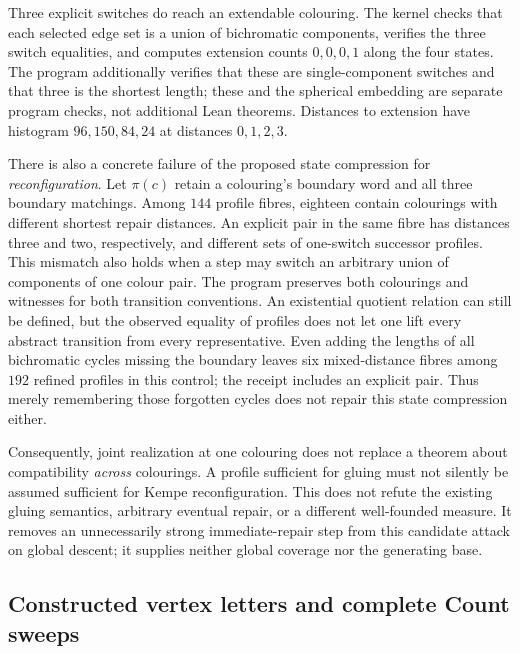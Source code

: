 Three explicit switches do reach an extendable colouring. The kernel checks
that each selected edge set is a union of bichromatic components, verifies
the three switch equalities, and computes extension counts $0,0,0,1$ along
the four states.
The program additionally verifies that these are single-component switches
and that three is the shortest length; these and the spherical embedding
are separate program checks, not additional Lean theorems. Distances to
extension have histogram $96,150,84,24$ at distances $0,1,2,3$.

There is also a concrete failure of the proposed state compression for
\emph{reconfiguration}. Let $\pi(c)$ retain a colouring's boundary word
and all three boundary matchings. Among $144$ profile fibres, eighteen
contain colourings with different shortest repair distances. An explicit
pair in the same fibre has distances three and two, respectively, and
different sets of one-switch successor profiles. This mismatch also holds
when a step may switch an arbitrary union of components of one colour pair.
The program preserves both colourings and witnesses for both transition
conventions. An existential quotient relation can still be defined, but
the observed equality of profiles does not let one lift every abstract
transition from every representative.
Even adding the lengths of all bichromatic cycles missing the boundary
leaves six mixed-distance fibres among $192$ refined profiles in this
control; the receipt includes an explicit pair. Thus merely remembering
those forgotten cycles does not repair this state compression either.

Consequently, joint realization at one colouring does not replace a theorem
about compatibility \emph{across} colourings. A profile sufficient for
gluing must not silently be assumed sufficient for Kempe reconfiguration.
This does not refute the existing gluing semantics, arbitrary eventual
repair, or a different well-founded measure. It removes an unnecessarily
strong immediate-repair step from this candidate attack on global descent;
it supplies neither global coverage nor the generating base.

\subsection{Constructed vertex letters and complete Count sweeps}
\label{sec:constructed-vertex-count}

